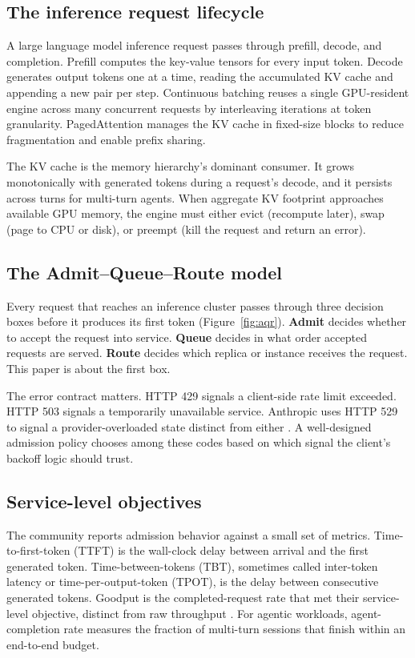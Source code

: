 \documentclass[10pt]{article} %
\theoremstyle{definition}
\begin{document}
\subsection{The inference request lifecycle}

A large language model inference request passes through prefill,
decode, and completion. Prefill computes the key-value tensors for
every input token. Decode generates output tokens one at a time,
reading the accumulated KV cache and appending a new pair per step.
Continuous batching \citep{yu2022orca} reuses a single GPU-resident
engine across many concurrent requests by interleaving iterations at
token granularity. PagedAttention \citep{kwon2023pagedattention} manages
the KV cache in fixed-size blocks to reduce fragmentation and enable
prefix sharing.

The KV cache is the memory hierarchy's dominant consumer. It grows
monotonically with generated tokens during a request's decode, and it
persists across turns for multi-turn agents. When aggregate KV
footprint approaches available GPU memory, the engine must either
evict (recompute later), swap (page to CPU or disk), or preempt (kill
the request and return an error).

\subsection{The Admit--Queue--Route model}

Every request that reaches an inference cluster passes through three
decision boxes before it produces its first token
(Figure~\ref{fig:aqr}). \textbf{Admit} decides whether to accept the
request into service. \textbf{Queue} decides in what order accepted
requests are served. \textbf{Route} decides which replica or instance
receives the request. This paper is about the first box.

The error contract matters. HTTP 429 signals a client-side rate limit
exceeded. HTTP 503 signals a temporarily unavailable service.
Anthropic uses HTTP 529 to signal a provider-overloaded state distinct
from either \citep{anthropic_api_errors}. A well-designed admission
policy chooses among these codes based on which signal the client's
backoff logic should trust.

\subsection{Service-level objectives}

The community reports admission behavior against a small set of
metrics. Time-to-first-token (TTFT) is the wall-clock delay between
arrival and the first generated token. Time-between-tokens (TBT),
sometimes called inter-token latency or time-per-output-token (TPOT),
is the delay between consecutive generated tokens. Goodput is the
completed-request rate that met their service-level objective, distinct
from raw throughput \citep{zhong2024distserve}. For agentic workloads,
agent-completion rate measures the fraction of multi-turn sessions
that finish within an end-to-end budget.
\end{document}
